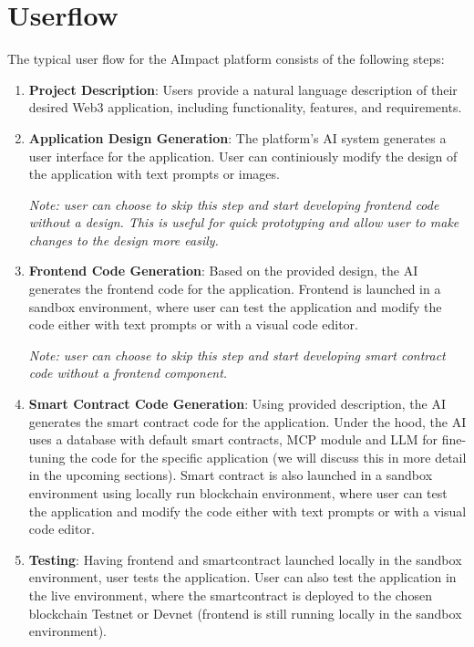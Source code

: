 \documentclass[12pt,a4paper]{article}
\begin{document}
\section{Userflow}
\label{sec:userflow}

The typical user flow for the AImpact platform consists of the following steps:

\begin{enumerate}
    \item \textbf{Project Description}: Users provide a natural language description of their desired Web3 application, including functionality, features, and requirements.
    
    \item \textbf{Application Design Generation}: The platform's AI system generates a user interface for the application. 
    User can continiously modify the design of the application with text prompts or images.
    
    \textit{Note: user can choose to skip this step and start developing frontend code without a design. 
    This is useful for quick prototyping and allow user to make changes to the design more easily.}
   
    \item \textbf{Frontend Code Generation}: 
    Based on the provided design, the AI generates the frontend code for the application. 
    Frontend is launched in a sandbox environment, where user can test the application and modify the code either with text prompts or with a visual code editor.
   
    \textit{Note: user can choose to skip this step and start developing smart contract code without a frontend component. }

    \item \textbf{Smart Contract Code Generation}: 
    Using provided description, the AI generates the smart contract code for the application. Under the hood, the AI uses a database with default smart contracts, MCP module and LLM for fine-tuning the code for the specific application (we will discuss this in more detail in the upcoming sections).
    Smart contract is also launched in a sandbox environment using locally run blockchain environment, where user can test the application and modify the code either with text prompts or with a visual code editor.
    

    \item \textbf{Testing}: 
    Having frontend and smartcontract launched locally in the sandbox environment, user tests the application.
    User can also test the application in the live environment, where the smartcontract is deployed to the chosen blockchain Testnet or Devnet (frontend is still running locally in the sandbox environment).
    


\end{enumerate}
\end{document}
